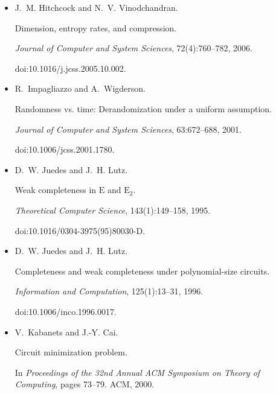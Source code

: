 \begin{itemize}
doi:10.4230/LIPICS.FSTTCS.2015.236.





\item[] 
[35]

J. M. Hitchcock and N. V. Vinodchandran.


Dimension, entropy rates, and compression.


\emph{Journal of Computer and System Sciences}, 72(4):760–782,
2006.


doi:10.1016/j.jcss.2005.10.002.





\item[] 
[36]

R. Impagliazzo and A. Wigderson.


Randomness vs. time: Derandomization under a uniform assumption.


\emph{Journal of Computer and System Sciences}, 63:672–688, 2001.


doi:10.1006/jcss.2001.1780.





\item[] 
[37]

D. W. Juedes and J. H. Lutz.


Weak completeness in $\mathrm{E}$ and $\mathrm{E}_{2}$.


\emph{Theoretical Computer Science}, 143(1):149–158, 1995.


doi:10.1016/0304-3975(95)80030-D.





\item[] 
[38]

D. W. Juedes and J. H. Lutz.


Completeness and weak completeness under polynomial-size circuits.


\emph{Information and Computation}, 125(1):13–31, 1996.


doi:10.1006/inco.1996.0017.





\item[] 
[39]

V. Kabanets and J.-Y. Cai.


Circuit minimization problem.


In \emph{Proceedings of the 32nd Annual ACM Symposium on Theory of
Computing}, pages 73–79. ACM, 2000.



\end{itemize}
